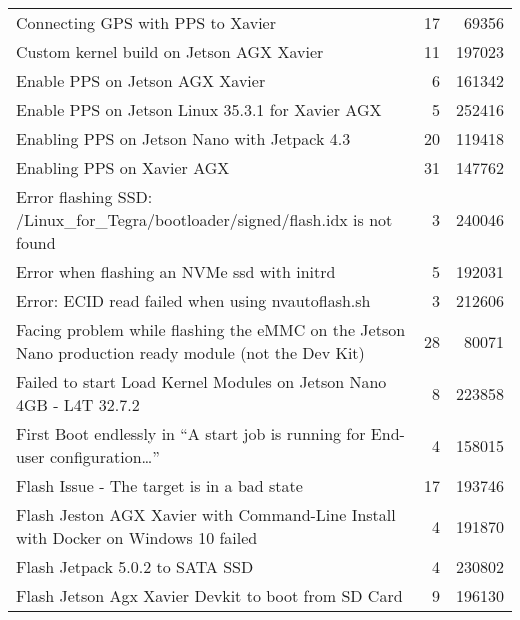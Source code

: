\begin{longtable}{p{}rr}
    Connecting GPS with PPS to Xavier                                                                   & 17       & 69356  \\
    Custom kernel build on Jetson AGX Xavier                                                            & 11       & 197023 \\
    Enable PPS on Jetson AGX Xavier                                                                     & 6        & 161342 \\
    Enable PPS on Jetson Linux 35.3.1 for Xavier AGX                                                    & 5        & 252416 \\
    Enabling PPS on Jetson Nano with Jetpack 4.3                                                        & 20       & 119418 \\
    Enabling PPS on Xavier AGX                                                                          & 31       & 147762 \\
    Error flashing SSD: /Linux\_for\_Tegra/bootloader/signed/flash.idx is not found                     & 3        & 240046 \\
    Error when flashing an NVMe ssd with initrd                                                         & 5        & 192031 \\
    Error: ECID read failed when using nvautoflash.sh                                                   & 3        & 212606 \\
    Facing problem while flashing the eMMC on the Jetson Nano production ready module (not the Dev Kit) & 28       & 80071  \\
    Failed to start Load Kernel Modules on Jetson Nano 4GB - L4T 32.7.2                                 & 8        & 223858 \\
    First Boot endlessly in “A start job is running for End-user configuration…”                        & 4        & 158015 \\
    Flash Issue - The target is in a bad state                                                          & 17       & 193746 \\
    Flash Jeston AGX Xavier with Command-Line Install with Docker on Windows 10 failed                  & 4        & 191870 \\
    Flash Jetpack 5.0.2 to SATA SSD                                                                     & 4        & 230802 \\
    Flash Jetson Agx Xavier Devkit to boot from SD Card                                                 & 9        & 196130 \\

\end{longtable}
